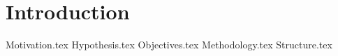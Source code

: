 \chapter{Introduction}
\label{chap:introduction}
  {Motivation.tex}
  {Hypothesis.tex}
  {Objectives.tex}
  {Methodology.tex}
  {Structure.tex}